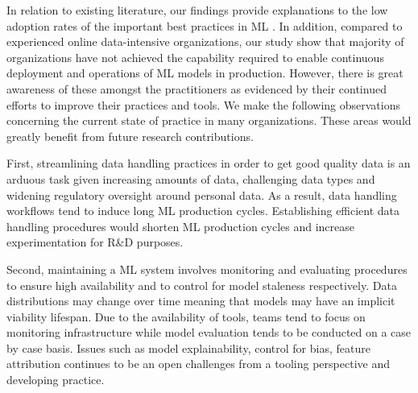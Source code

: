 In relation to existing literature, our findings provide explanations to the low adoption rates of the important best practices in ML \cite{Serban2020Practices}. In addition, compared to experienced online data-intensive organizations, our study show that majority of organizations have not achieved the capability required to enable continuous deployment and operations of ML models in production. However, there is great awareness of these amongst the practitioners as evidenced by their continued efforts to improve their practices and tools. We make the following observations concerning the current state of practice  in many organizations. These areas would greatly benefit from future research contributions.

First, streamlining data handling practices in order to get good quality data is an arduous task given increasing amounts of data, challenging data types and widening regulatory oversight around personal data. As a result, data handling workflows tend to induce long ML production cycles. Establishing efficient data handling procedures would shorten ML production cycles and increase experimentation for R\&D purposes. 

Second, maintaining a ML system involves monitoring and evaluating procedures to ensure high availability and to control for model staleness respectively. Data distributions may change over time meaning that models may have an implicit viability lifespan. Due to the availability of tools, teams tend to focus on monitoring infrastructure while model evaluation tends to be conducted on a case by case basis. Issues such as model explainability, control for bias, feature attribution continues to be an open challenges from a tooling perspective and developing practice. 

